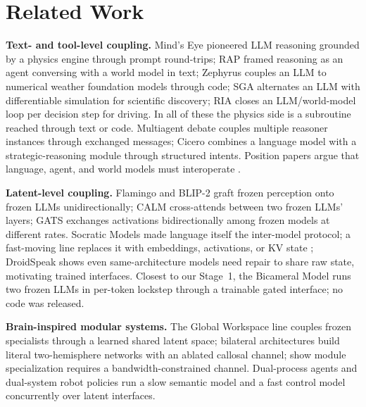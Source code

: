\documentclass[11pt]{article}
\begin{document}
\begin{enumerate}
\end{enumerate}

\section{Related Work}
\label{sec:related}

\textbf{Text- and tool-level coupling.} Mind's Eye \citep{liu2023mindseye} pioneered LLM reasoning grounded by a physics engine through prompt round-trips; RAP \citep{hao2023rap} framed reasoning as an agent conversing with a world model in text; Zephyrus \citep{varambally2026zephyrus} couples an LLM to numerical weather foundation models through code; SGA \citep{ma2024sga} alternates an LLM with differentiable simulation for scientific discovery; RIA \citep{sun2026ria} closes an LLM/world-model loop per decision step for driving. In all of these the physics side is a subroutine reached through text or code. Multiagent debate \citep{du2024debate} couples multiple reasoner instances through exchanged messages; Cicero \citep{bakhtin2022cicero} combines a language model with a strategic-reasoning module through structured intents. Position papers argue that language, agent, and world models must interoperate \citep{hu2023law,lecun2022ami}.

\textbf{Latent-level coupling.} Flamingo \citep{alayrac2022flamingo} and BLIP-2 \citep{li2023blip2} graft frozen perception onto frozen LLMs unidirectionally; CALM \citep{bansal2024calm} cross-attends between two frozen LLMs' layers; GATS \citep{zolna2024gats} exchanges activations bidirectionally among frozen models at different rates. Socratic Models \citep{zeng2023socratic} made language itself the inter-model protocol; a fast-moving line replaces it with embeddings, activations, or KV state \citep{pham2024cipher,ramesh2025activations,zou2025latentmas,liu2026wormhole,shen2024collm,rodionov2025hogwild,wang2025parallelsurvey}; DroidSpeak \citep{liu2024droidspeak} shows even same-architecture models need repair to share raw state, motivating trained interfaces. Closest to our Stage~1, the Bicameral Model \citep{flamant2026bicameral} runs two frozen LLMs in per-token lockstep through a trainable gated interface; no code was released.

\textbf{Brain-inspired modular systems.} The Global Workspace line \citep{vanrullen2021glw,devillers2023gw,maytie2025gwdreamer,goyal2022workspace} couples frozen specialists through a learned shared latent space; bilateral architectures \citep{rajagopalan2022bilateral,rinaldo2024leftright} build literal two-hemisphere networks with an ablated callosal channel; \citet{bena2024specialization} show module specialization requires a bandwidth-constrained channel. Dual-process agents \citep{booch2021sofai,deepmind2024talker} and dual-system robot policies \citep{figure2025helix,nvidia2025groot} run a slow semantic model and a fast control model concurrently over latent interfaces.
\end{document}
